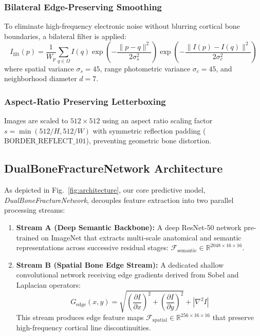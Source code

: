 \documentclass[journal]{IEEEtran}
\begin{document}
\subsubsection{Bilateral Edge-Preserving Smoothing}
To eliminate high-frequency electronic noise without blurring cortical bone boundaries, a bilateral filter is applied:
\begin{equation}
    I_{\text{filt}}(p) = \frac{1}{W_p} \sum_{q \in \Omega} I(q) \exp\left(-\frac{\|p - q\|^2}{2\sigma_s^2}\right) \exp\left(-\frac{\|I(p) - I(q)\|^2}{2\sigma_c^2}\right)
\end{equation}
where spatial variance $\sigma_s = 45$, range photometric variance $\sigma_c = 45$, and neighborhood diameter $d = 7$.

\subsubsection{Aspect-Ratio Preserving Letterboxing}
Images are scaled to $512 \times 512$ using an aspect ratio scaling factor $s = \min(512/H, 512/W)$ with symmetric reflection padding ($\text{BORDER\_REFLECT\_101}$), preventing geometric bone distortion.

\subsection{DualBoneFractureNetwork Architecture}
As depicted in Fig.~\ref{fig:architecture}, our core predictive model, \textit{DualBoneFractureNetwork}, decouples feature extraction into two parallel processing streams:
\begin{enumerate}
    \item \textbf{Stream A (Deep Semantic Backbone):} A deep ResNet-50 network pre-trained on ImageNet that extracts multi-scale anatomical and semantic representations across successive residual stages: $\mathcal{F}_{\text{semantic}} \in \mathbb{R}^{2048 \times 16 \times 16}$.
    \item \textbf{Stream B (Spatial Bone Edge Stream):} A dedicated shallow convolutional network receiving edge gradients derived from Sobel and Laplacian operators:
    \begin{equation}
        G_{\text{edge}}(x, y) = \sqrt{\left(\frac{\partial I}{\partial x}\right)^2 + \left(\frac{\partial I}{\partial y}\right)^2} + \left|\nabla^2 I\right|
    \end{equation}
    This stream produces edge feature maps $\mathcal{F}_{\text{spatial}} \in \mathbb{R}^{256 \times 16 \times 16}$ that preserve high-frequency cortical line discontinuities.
\end{enumerate}
\end{document}
